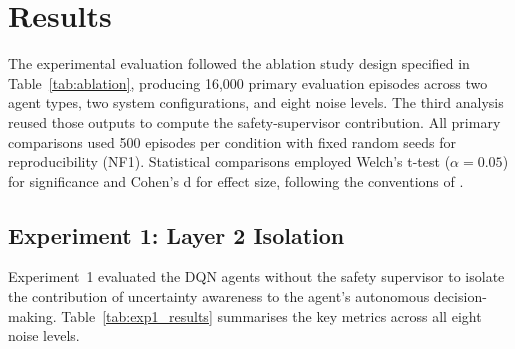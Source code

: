 \documentclass[12pt,a4paper]{report}
\begin{document}
\section{Results}

The experimental evaluation followed the ablation study design specified in Table~\ref{tab:ablation}, producing 16,000 primary evaluation episodes across two agent types, two system configurations, and eight noise levels. The third analysis reused those outputs to compute the safety-supervisor contribution. All primary comparisons used 500 episodes per condition with fixed random seeds for reproducibility (NF1). Statistical comparisons employed Welch's t-test ($\alpha = 0.05$) for significance and Cohen's d for effect size, following the conventions of \citet{cohen1988statistical}.

\subsection{Experiment 1: Layer 2 Isolation}

Experiment~1 evaluated the DQN agents without the safety supervisor to isolate the contribution of uncertainty awareness to the agent's autonomous decision-making. Table~\ref{tab:exp1_results} summarises the key metrics across all eight noise levels.


\begin{table}[h]
\centering
\small
\caption{Experiment~1 results: UA vs Blind agent without safety supervisor. Significance: * $p < 0.05$, ** $p < 0.01$, *** $p < 0.001$, ns = not significant.}
\label{tab:exp1_results}
\renewcommand{\arraystretch}{1.2}
\setlength{\tabcolsep}{4pt}
\end{table}
\end{document}
